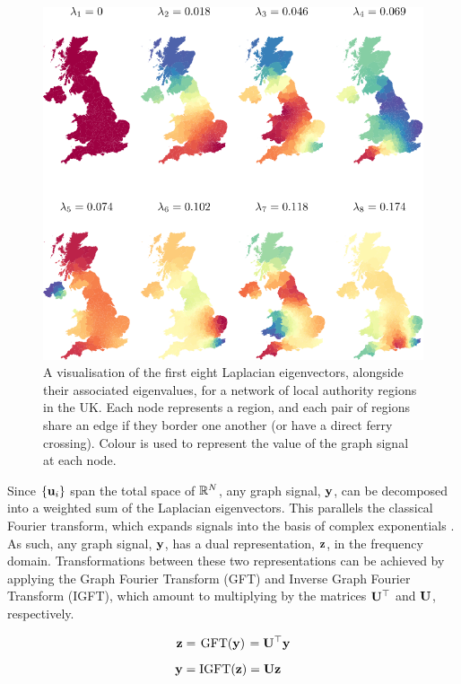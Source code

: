 \begin{figure}[t]
	\centering
		\includegraphics[width=0.85\linewidth]{Figures/uk_plot.pdf}
        \caption[A visualisation of the Laplacian eigenvectors for a network of regions in the UK]{A visualisation of the first eight Laplacian eigenvectors, alongside their associated eigenvalues, for a network of local authority regions in the UK. Each node represents a region, and each pair of regions share an edge if they border one another (or have a direct ferry crossing). Colour is used to represent the value of the graph signal at each node.  }
	\label{fig:uk_eigs}
\end{figure}


Since $\{\mathbf{u}_i\}$ span the total space of $\mathbb{R}^N$, any graph signal, $\mathbf{y}$, can be decomposed into a weighted sum of the Laplacian eigenvectors. This parallels the classical Fourier transform, which expands signals into the basis of complex exponentials \citep{Sneddon1995}. As such, any graph signal, $\mathbf{y}$, has a dual representation, $\mathbf{z}$, in the frequency domain. Transformations between these two representations can be achieved by applying the Graph Fourier Transform (GFT) and Inverse Graph Fourier Transform (IGFT), which amount to multiplying by the matrices $\mathbf{U}^\top$ and $\mathbf{U}$, respectively.

\begin{align}
    \mathbf{z} &= \mkern 2mu \text{GFT}(\mathbf{y}) \mkern 2mu = \mathbf{U}^\top \mathbf{y} \\[0.2cm]
    \mathbf{y} &= \text{IGFT}(\mathbf{z})  = \mathbf{U} \mathbf{z}
\end{align}

